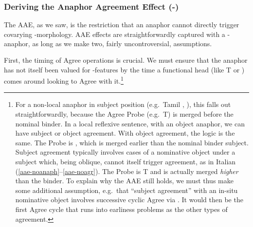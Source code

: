\documentclass[output=paper, modfonts, nonflat]{langsci/langscibook}
\begin{document}
\subsubsection{Deriving the Anaphor Agreement Effect (\nul-\person)}

The AAE, as we saw, is the restriction that an anaphor cannot directly
trigger covarying \ph-morphology.  AAE effects are straightforwardly
captured with a \nul-\person{} anaphor, as long as we make two, fairly
uncontroversial, assumptions.

First, the timing of Agree operations is crucial. We must ensure that
the anaphor has not itself been valued for \ph-features by the time a
functional head (like T or \lilv) comes around looking to Agree with
it.\footnote{For a non-local anaphor in subject position (e.g.\ Tamil
  \taan{}, \citealp{sundaresan:2016a, sundaresan:2018}), this falls out
  straightforwardly, because the Agree Probe (e.g.\ T) is merged
  before the nominal binder. In a local reflexive sentence, with an
  object anaphor, we can have subject or object agreement. With object
  agreement, the logic is the same. The Probe is \lilv, which is
  merged earlier than the nominal binder subject. Subject agreement
  typically involves cases of a nominative object under a subject
  which, being oblique, cannot itself trigger agreement, as in Italian
  (\ref{aae-noanaph}--\ref{aae-noagr}). The Probe is T and is
  actually merged \emph{higher} than the binder. To explain why the
  AAE still holds, we must thus make some additional assumption, e.g.\
  that ``subject agreement'' with an in-situ nominative object
  involves successive cyclic Agree via \lilv. It would then be the
  first Agree cycle that runs into earliness problems as the other
  types of agreement.}
\end{document}

